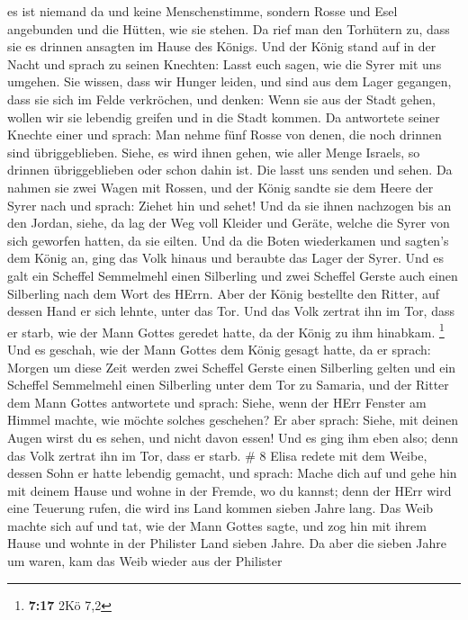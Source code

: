 es ist niemand da und keine Menschenstimme, sondern Rosse und Esel
angebunden und die Hütten, wie sie stehen.  Da rief man den
Torhütern zu, dass sie es drinnen ansagten im Hause des Königs.
 Und der König stand auf in der Nacht und sprach zu seinen
Knechten: Lasst euch sagen, wie die Syrer mit uns umgehen. Sie wissen,
dass wir Hunger leiden, und sind aus dem Lager gegangen, dass sie sich
im Felde verkröchen, und denken: Wenn sie aus der Stadt gehen, wollen
wir sie lebendig greifen und in die Stadt kommen.  Da
antwortete seiner Knechte einer und sprach: Man nehme fünf Rosse von
denen, die noch drinnen sind übriggeblieben. Siehe, es wird ihnen gehen,
wie aller Menge Israels, so drinnen übriggeblieben oder schon dahin ist.
Die lasst uns senden und sehen.  Da nahmen sie zwei Wagen
mit Rossen, und der König sandte sie dem Heere der Syrer nach und
sprach: Ziehet hin und sehet!  Und da sie ihnen nachzogen
bis an den Jordan, siehe, da lag der Weg voll Kleider und Geräte, welche
die Syrer von sich geworfen hatten, da sie eilten. Und da die Boten
wiederkamen und sagten's dem König an,  ging das Volk
hinaus und beraubte das Lager der Syrer. Und es galt ein Scheffel
Semmelmehl einen Silberling und zwei Scheffel Gerste auch einen
Silberling nach dem Wort des HErrn.  Aber der König
bestellte den Ritter, auf dessen Hand er sich lehnte, unter das Tor. Und
das Volk zertrat ihn im Tor, dass er starb, wie der Mann Gottes geredet
hatte, da der König zu ihm hinabkam. \footnote{\textbf{7:17} 2Kö 7,2}
 Und es geschah, wie der Mann Gottes dem König gesagt
hatte, da er sprach: Morgen um diese Zeit werden zwei Scheffel Gerste
einen Silberling gelten und ein Scheffel Semmelmehl einen Silberling
unter dem Tor zu Samaria,  und der Ritter dem Mann Gottes
antwortete und sprach: Siehe, wenn der HErr Fenster am Himmel machte,
wie möchte solches geschehen? Er aber sprach: Siehe, mit deinen Augen
wirst du es sehen, und nicht davon essen!  Und es ging ihm
eben also; denn das Volk zertrat ihn im Tor, dass er starb. \# 8
 Elisa redete mit dem Weibe, dessen Sohn er hatte lebendig
gemacht, und sprach: Mache dich auf und gehe hin mit deinem Hause und
wohne in der Fremde, wo du kannst; denn der HErr wird eine Teuerung
rufen, die wird ins Land kommen sieben Jahre lang.  Das Weib
machte sich auf und tat, wie der Mann Gottes sagte, und zog hin mit
ihrem Hause und wohnte in der Philister Land sieben Jahre. 
Da aber die sieben Jahre um waren, kam das Weib wieder aus der Philister
